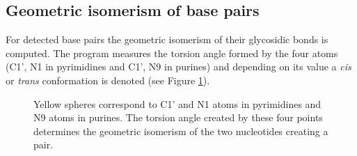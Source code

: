 \documentclass[12pt]{article}
\begin{document}
\subsection{Geometric isomerism of base pairs}
For detected base pairs the geometric isomerism of their glycosidic bonds is computed. The program measures the torsion angle formed by the four atoms (C1', N1 in pyrimidines and C1', N9 in purines) and depending on its value a {\it cis} or {\it trans} conformation is denoted (see Figure \ref{Conf}).

\begin{figure}[h!]
\begin{center}
\end{center}
\caption{Yellow spheres correspond to C1' and N1 atoms in pyrimidines and N9 atoms in purines. The torsion angle created by these four points determines the geometric isomerism of the two nucleotides creating a pair. }
\label{Conf}
\end{figure}

\end{document}
